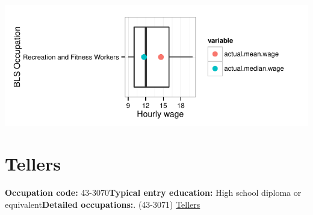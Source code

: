 \documentclass[a4paper,10pt]{article}\usepackage[]{graphicx}\usepackage[]{color}
\makeatletter
\def\maxwidth{ %
  \ifdim\Gin@nat@width>\linewidth
    \linewidth
  \else
    \Gin@nat@width
  \fi
}
\makeatother
\begin{document}
{\centering \includegraphics[width=\maxwidth]{figure/unnamed-chunk-258} 

}


\newpage\section{Tellers}\textbf{Occupation code:} 43-3070\newline\textbf{Typical entry education:} High school diploma or equivalent\newline\textbf{Detailed occupations:}. (43-3071)  \href{http://www.bls.gov/oes/current/oes433071.htm}{Tellers}\newline%
\end{document}
